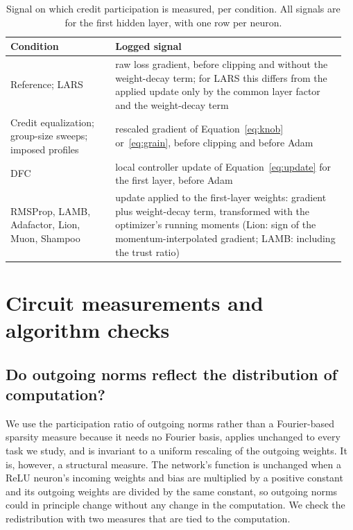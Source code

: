 \documentclass{article} %
\begin{document}
\begin{table}[!ht]
\caption{Signal on which credit participation is measured, per condition. All signals are for the first hidden layer, with one row per neuron.}
\label{tab:creditconv}
\begin{center}
\small
\begin{tabular}{@{}p{0.30\linewidth}p{0.66\linewidth}@{}}
\toprule
Condition & Logged signal \\
\midrule
Reference; LARS & raw loss gradient, before clipping and without the weight-decay term; for LARS this differs from the applied update only by the common layer factor and the weight-decay term \\
Credit equalization; group-size sweeps; imposed profiles & rescaled gradient of Equation~\ref{eq:knob} or~\ref{eq:grain}, before clipping and before Adam \\
DFC & local controller update of Equation~\ref{eq:update} for the first layer, before Adam \\
RMSProp, LAMB, Adafactor, Lion, Muon, Shampoo & update applied to the first-layer weights: gradient plus weight-decay term, transformed with the optimizer's running moments (Lion: sign of the momentum-interpolated gradient; LAMB: including the trust ratio) \\
\bottomrule
\end{tabular}
\end{center}
\end{table}

\section{Circuit measurements and algorithm checks}
\label{app:measures}

\subsection{Do outgoing norms reflect the distribution of computation?}
\label{app:functional}
We use the participation ratio of outgoing norms rather than a Fourier-based sparsity measure because it needs no Fourier basis, applies unchanged to every task we study, and is invariant to a uniform rescaling of the outgoing weights. It is, however, a structural measure. The network's function is unchanged when a ReLU neuron's incoming weights and bias are multiplied by a positive constant and its outgoing weights are divided by the same constant, so outgoing norms could in principle change without any change in the computation. We check the redistribution with two measures that are tied to the computation.
\end{document}
